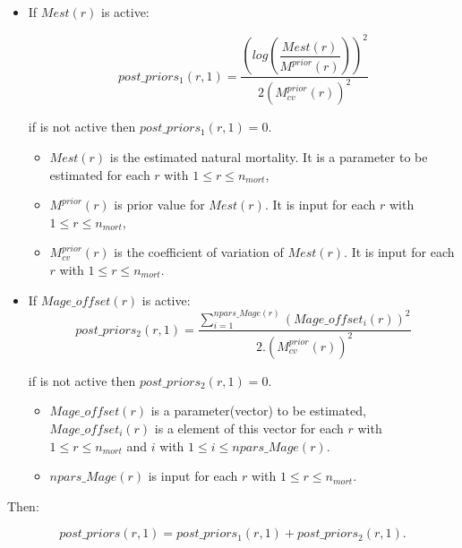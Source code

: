 \documentclass{article}
\begin{document}
\begin{itemize}
    \item If $Mest(r)$ is active:
    
    \begin{equation}
     post\_priors_1(r,1) = \dfrac{\left(log\left(\dfrac{Mest(r)}{M^{prior}(r)}\right)\right)^2}{2({M^{prior}_{cv}}(r))^2}
    \end{equation}
    
    if is not active then $post\_priors_1(r,1)=0$.
    
    \begin{itemize}
        \item $Mest(r)$ is the estimated natural mortality. It is a parameter to be estimated for each $r$ with $1\leq r \leq n_{mort}$,
    
        \item $M^{prior}(r)$ is prior value for $Mest(r)$. It is input for each $r$ with $1\leq r \leq n_{mort}$,
        
        \item $M^{prior}_{cv}(r)$ is the coefficient of variation of $Mest(r)$. It is input for each $r$ with $1\leq r \leq n_{mort}$.
    \end{itemize}
        
\item If $Mage\_offset(r)$ is active:
        \begin{equation}
            post\_priors_2(r,1) = \dfrac{\displaystyle\sum_{i=1}^{npars\_Mage(r)}(Mage\_offset_i(r))^2}{2.({M^{prior}_{cv}}(r))^2}
        \end{equation}
        
        if is not active then $post\_priors_2(r,1)=0$.
        
        \begin{itemize}
        \item $Mage\_offset(r)$ is a parameter(vector) to be estimated, $Mage\_offset_i(r)$  is a element of this vector for each $r$ with $1\leq r \leq n_{mort}$ and $i$ with $1\leq i \leq npars\_Mage(r)$.
        
        \item $npars\_Mage(r)$ is input for each $r$ with $1\leq r \leq n_{mort}$.
        \end{itemize}
    \end{itemize}
    
Then:

        \begin{equation}
        post\_priors(r,1)=post\_priors_1(r,1)+post\_priors_2(r,1).
        \end{equation}
    
\end{document}
